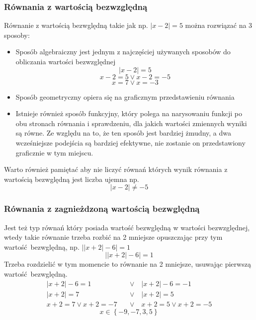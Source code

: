 \documentclass[12pt, a4paper]{article}
\begin{document}
\subsubsection*{Równania z wartością bezwzględną}
Równanie z wartością bezwględną takie jak np. $\left|x-2\right|=5$ można rozwiązać na 3 sposoby:
\begin{itemize}
  \item Sposób algebraiczny jest jednym z najczęściej używanych sposobów do obliczania wartości bezwzględnej
      $$\left|x-2\right|=5$$
      $$x-2=5 \vee x-2=-5$$
      $$x=7\vee x=-3$$
  \item Sposób geometryczny opiera się na graficznym przedstawieniu równania
    \begin{center}
    \end{center}
  \item Istnieje również sposób funkcyjny, który polega na narysowaniu funkcji po
        obu stronach równania i sprawdzeniu, dla jakich wartości zmiennych wyniki są
        równe. Ze względu na to, że ten sposób jest bardziej żmudny, a dwa wcześniejsze
        podejścia są bardziej efektywne, nie zostanie on przedstawiony graficznie w tym miejscu.
\end{itemize}
Warto również pamiętać aby nie liczyć równań których wynik równania z wartością bezwględną jest liczba ujemna np.
$$\left|x-2\right|\neq-5$$


\subsubsection*{Równania z zagnieżdzoną wartością bezwględną}
Jest też typ równań który posiada wartość bezwględną w wartości bezwzględnej,
wtedy takie równanie trzeba rozbić na 2 mniejsze opuszczając przy tym
wartość bezwględną, np. $\left|\left|x+2\right|-6\right| = 1$
$$\left|\left|x+2\right|-6\right|=1$$
Trzeba rozdzielić w tym momencie to równanie na 2 mniejsze, usuwając pierwszą wartość bezwględną.
\begin{align*}
\left|x+2\right|-6=1 \quad & \vee \quad \left|x+2\right|-6=-1 \\
\left|x+2\right|=7 \quad & \vee \quad \left|x+2\right|=5 \\
x+2=7 \vee x+2=-7 \hspace{1em} & \vee \hspace{1em} x+2=5 \vee x+2=-5
\end{align*}
$$x \in \left\{ -9, -7, 3, 5\right\}$$
\end{document}
